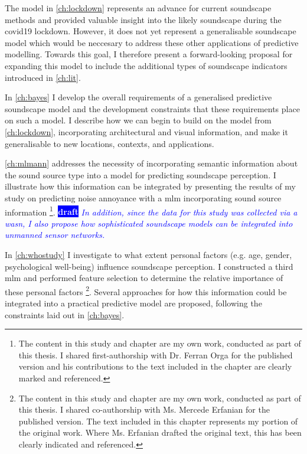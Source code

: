 \documentclass[twoside,fontsize=12pt,titlepage,chapterprefix=true
]{scrbook}
\newcommand{\remark}[3]{%
    {\colorbox{#2}{\sffamily\scriptsize\bfseries\textcolor{white}{#1}}}
    {\sffamily\small\itshape\textcolor{#2}{#3}}
}
\newcommand{\draft}[1]{\remark{draft}{blue}{#1}}
\begin{document}
The model in \cref{ch:lockdown} represents an advance for current soundscape methods and provided valuable insight into the likely soundscape during the \gls{covid19} lockdown. However, it does not yet represent a generalisable soundscape model which would be neccesary to address these other applications of predictive modelling. Towards this goal, I therefore present a forward-looking proposal for expanding this model to include the additional types of soundscape indicators introduced in \cref{ch:lit}. 

In \cref{ch:bayes} I develop the overall requirements of a generalised predictive soundscape model and the development constraints that these requirements place on such a model. I describe how we can begin to build on the model from \cref{ch:lockdown}, incorporating architectural and visual information, and make it generalisable to new locations, contexts, and applications. 

\cref{ch:mlmann} addresses the necessity of incorporating semantic information about the sound source type into a model for predicting soundscape perception. I illustrate how this information can be integrated by presenting the results of my study on predicting noise annoyance with a \gls{mlm} incorporating sound source information \citep{Orga2021Multilevel}\footnote{The content in this study and chapter are my own work, conducted as part of this thesis. I shared first-authorship with Dr. Ferran Orga for the published version and his contributions to the text included in the chapter are clearly marked and referenced. }. \draft{In addition, since the data for this study was collected via a \gls{wasn}, I also propose how sophisticated soundscape models can be integrated into unmanned sensor networks.}

In \cref{ch:whostudy} I investigate to what extent personal factors (e.g. age, gender, psychological well-being) influence soundscape perception. I constructed a third \gls{mlm} and performed feature selection to determine the relative importance of these personal factors \citep{Erfanian2021Psychological}\footnote{The content in this study and chapter are my own work, conducted as part of this thesis. I shared co-authorship with Ms. Mercede Erfanian for the published version. The text included in this chapter represents my portion of the original work. Where Ms. Erfanian drafted the original text, this has been clearly indicated and referenced.}. Several approaches for how this information could be integrated into a practical predictive model are proposed, following the constraints laid out in \cref{ch:bayes}.
\end{document}
